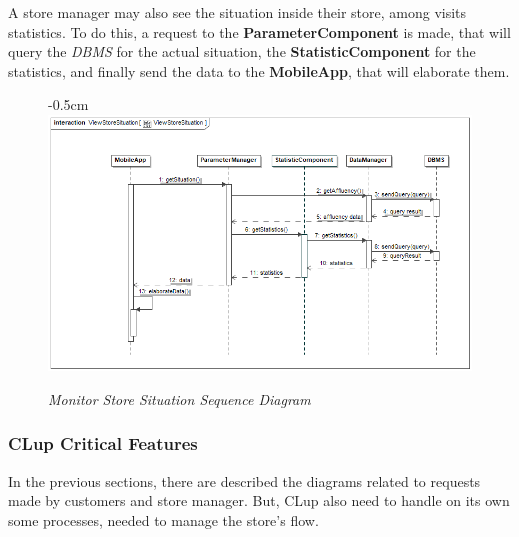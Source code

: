 \documentclass{article}
\begin{document}
	A store manager may also see the situation inside their store, among visits statistics. To do this, a request to the {\bfseries ParameterComponent} is made, that will query the \emph{DBMS} for the actual situation, the {\bfseries StatisticComponent} for the statistics, and finally send the data to the {\bfseries MobileApp}, that will elaborate them.

	\begin{figure}[H]
		\begin{adjustwidth} {-0.5cm}{}
			\centering
			\includegraphics[scale=0.33]{Sequence Diagrams/sd__ViewStoreSituation__ViewStoreSituation.png}
			\end{adjustwidth}
		\caption{\emph{Monitor Store Situation Sequence Diagram}}
	\end{figure}
	\subsubsection{CLup Critical Features}
	In the previous sections, there are described the diagrams related to requests made by customers and store manager. But, CLup also need to handle on its own some processes, needed to manage the store's flow.\\
\end{document}
